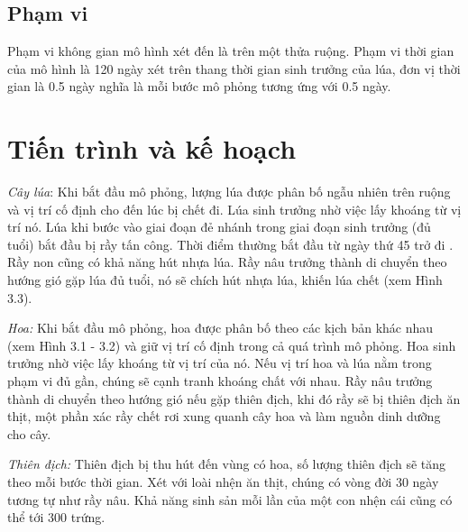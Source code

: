 \documentclass[13pt]{extreport}
\begin{document}
{%

\subsection*{Phạm vi}
Phạm vi không gian mô hình xét đến là trên một thửa ruộng. Phạm vi thời gian của mô hình là 120 ngày xét trên thang thời gian sinh trưởng của lúa, đơn vị thời gian là 0.5 ngày nghĩa là mỗi bước mô phỏng tương ứng với 0.5 ngày.

\section{Tiến trình và kế hoạch}

\textit{\indent Cây lúa}: Khi bắt đầu mô phỏng, lượng lúa được phân bố ngẫu nhiên trên ruộng và vị trí cố định cho đến lúc bị chết đi. Lúa sinh trưởng nhờ việc lấy khoáng từ vị trí nó. Lúa khi bước vào giai đoạn đẻ nhánh trong giai đoạn sinh trưởng (đủ tuổi) bắt đầu bị rầy tấn công. Thời điểm thường bắt đầu từ ngày thứ 45 trở đi \cite{sachhd2}. Rầy non cũng có khả năng hút nhựa lúa. Rầy nâu trưởng thành di chuyển theo hướng gió gặp lúa đủ tuổi, nó sẽ chích hút nhựa lúa, khiến lúa chết (xem Hình 3.3).

\textit{Hoa:} Khi bắt đầu mô phỏng, hoa được phân bố theo các kịch bản khác nhau (xem Hình 3.1 - 3.2) và giữ vị trí cố định trong cả quá trình mô phỏng. Hoa sinh trưởng nhờ việc lấy khoáng từ vị trí của nó. Nếu vị trí hoa và lúa nằm trong phạm vi đủ gần, chúng sẽ cạnh tranh khoáng chất với nhau. Rầy nâu trưởng thành di chuyển theo hướng gió nếu gặp thiên địch, khi đó rầy sẽ bị thiên địch ăn thịt, một phần xác rầy chết rơi xung quanh cây hoa và làm nguồn dinh dưỡng cho cây.

\textit{Thiên địch:} Thiên địch bị thu hút đến vùng có hoa, số lượng thiên địch sẽ tăng theo mỗi bước thời gian. Xét với loài nhện ăn thịt, chúng có vòng đời 30 ngày tương tự như rầy nâu. Khả năng sinh sản mỗi lần của một con nhện cái cũng có thể tới 300 trứng.

}
\end{document}

